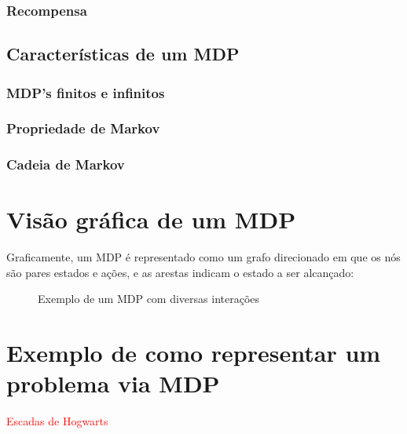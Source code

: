 \documentclass{article}
\begin{document}
            \subsubsection{Recompensa}
        
        
        \subsection{Características de um MDP}
        
            \subsubsection{MDP's finitos e infinitos}
            
            \subsubsection{Propriedade de Markov}
            
            \subsubsection{Cadeia de Markov}
        
    \section{Visão gráfica de um MDP}
    
        Graficamente, um MDP é representado como um grafo direcionado em que os nós são pares estados e ações, e as arestas indicam o estado a ser alcançado:
    
        \begin{figure}[ht]
            \centering
            \mdpbig
            \caption{Exemplo de um MDP com diversas interações}
            \label{diag:mdp-big}
        \end{figure}
        
    \section{Exemplo de como representar um problema via MDP}
    
        \textcolor{red}{Escadas de Hogwarts}
    
\end{document}

